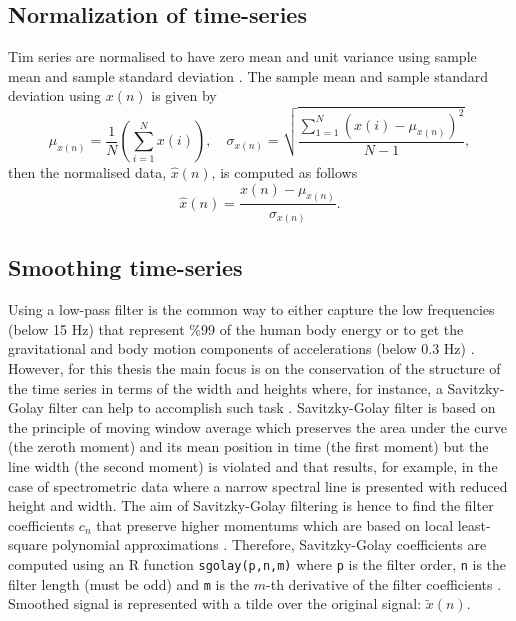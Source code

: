 \subsection{Normalization of time-series}
Tim series are normalised to have zero mean and unit variance 
using sample mean and sample standard deviation \citep{loffe2015}.
The sample mean and sample standard deviation using $x(n)$ is given by
\begin{equation}\label{eq:ms}
\mu_{x(n)}= \frac{1}{N} ( \sum_{i=1}^N x(i) ), \quad  \sigma_{x(n)} =  \sqrt{ \frac{  \sum_{1=1}^N ( x(i) - \mu_{x(n)} )^2 }{ N-1 }  },      
\end{equation}
then the normalised data, $\hat{x}(n)$, is computed as follows
\begin{equation}\label{eq:normalization}
\hat{x} (n) = \frac{   x(n) -  \mu_{x(n)}  }{   \sigma_{x(n)} }.   
\end{equation}

\subsection{Smoothing time-series}
Using a low-pass filter is the common way to either capture the low 
frequencies (below 15 Hz) that represent \%99 of the human body 
energy or to get the gravitational and body motion components of 
accelerations (below 0.3 Hz) \citep{anguita2013}.
However, for this thesis the main focus is on the conservation of the 
structure of the time series in terms of the width and heights where, 
for instance, a Savitzky-Golay filter can help to accomplish such task 
\citep{press1992}. Savitzky-Golay filter is based on the principle of moving 
window average which preserves the area under the curve (the zeroth moment)
and its mean position in time (the first moment) but the line width 
(the second moment) is violated and that results, for example, in the case 
of spectrometric data where a narrow spectral line is presented with 
reduced height and width. 
The aim of Savitzky-Golay filtering is hence to find the filter coefficients 
$c_n$ that preserve higher momentums which are based on local least-square 
polynomial approximations 
\citep{savitzkygolay1964, press1992, schafer2011}.
Therefore, Savitzky-Golay coefficients are computed using an R function 
\texttt{sgolay(p,n,m)} where \texttt{p} is the filter order, 
\texttt{n} is the filter length (must be odd) 
and \texttt{m} is the $m$-th derivative of the filter coefficients 
\citep{Rsignal}. Smoothed signal is represented with a tilde over the 
original signal: $\tilde{x}(n)$.



